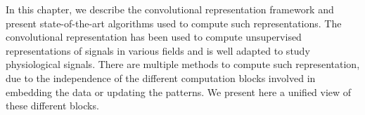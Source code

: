 \documentclass[../thesis.tex]{subfiles}
\begin{document}
	In this chapter, we describe the convolutional representation framework and present
	state-of-the-art algorithms used to compute such representations. The convolutional
	representation has been used to compute unsupervised representations of signals
	in various fields and is well adapted to study physiological signals. There are multiple
	methods to compute such representation, due to the independence of the different computation
	blocks involved in embedding the data or updating the patterns. We present here a unified
	view of these different blocks.

\biblio{}
\end{document}
